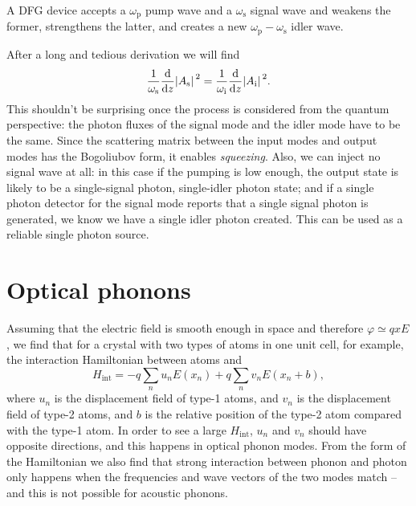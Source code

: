 \documentclass[hyperref, a4paper]{article}
\begin{document}
A DFG device accepts a $\omega_{\text{p}}$ pump wave 
and a $\omega_{\text{s}}$ signal wave 
and weakens the former, strengthens the latter, 
and creates a new $\omega_{\text{p}} - \omega_{\text{s}}$ idler wave.

After a long and tedious derivation we will find 
\begin{equation}
    \frac{1}{\omega_{\text{s}}} \dv{z} \abs*{A_\text{s}}^2 = 
    \frac{1}{\omega_{\text{i}}} \dv{z} \abs*{A_\text{i}}^2 . 
\end{equation}
This shouldn't be surprising once the process is considered from the quantum perspective:
the photon fluxes of the signal mode and the idler mode 
have to be the same.
Since the scattering matrix between the input modes and output modes 
has the Bogoliubov form, it enables \emph{squeezing}.
Also, we can inject no signal wave at all:
in this case if the pumping is low enough, 
the output state is likely to be a 
single-signal photon, single-idler photon state; 
and if a single photon detector for the signal mode reports 
that a single signal photon is generated, 
we know we have a single idler photon created.
This can be used as a reliable single photon source.

\section{Optical phonons}

Assuming that the electric field is smooth enough in space 
and therefore $\varphi \simeq q x E$, 
we find that for a crystal with two types of atoms in one unit cell, for example,
the interaction Hamiltonian between atoms and 
\begin{equation}
    H_{\text{int}} = - q \sum_n u_n E(x_n) 
    + q \sum_n v_n E(x_n + b),
\end{equation}
where $u_n$ is the displacement field of type-1 atoms, 
and $v_n$ is the displacement field of type-2 atoms,
and $b$ is the relative position of the type-2 atom 
compared with the type-1 atom.
In order to see a large $H_{\text{int}}$, 
$u_n$ and $v_n$ should have opposite directions, 
and this happens in optical phonon modes.
From the form of the Hamiltonian we also find that 
strong interaction between phonon and photon only happens 
when the frequencies and wave vectors of the two modes match -- 
and this is not possible for acoustic phonons.
\end{document}
